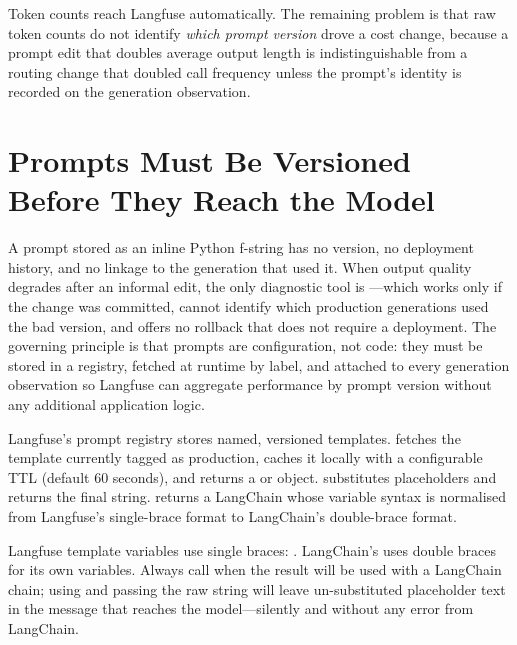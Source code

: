 Token counts reach Langfuse automatically. The remaining problem is
that raw token counts do not identify \emph{which prompt version}
drove a cost change, because a prompt edit that doubles average output
length is indistinguishable from a routing change that doubled call
frequency unless the prompt's identity is recorded on the generation
observation.


\section{Prompts Must Be Versioned Before They Reach the Model}
\label{sec:obs-prompt-management}

A prompt stored as an inline Python f-string has no version, no
deployment history, and no linkage to the generation that used it.
When output quality degrades after an informal edit, the only
diagnostic tool is ---which works only if the change
was committed, cannot identify which production generations used the
bad version, and offers no rollback that does not require a deployment.
The governing principle is that prompts are configuration, not code:
they must be stored in a registry, fetched at runtime by label, and
attached to every generation observation so Langfuse can aggregate
performance by prompt version without any additional application logic.

Langfuse's prompt registry stores named, versioned templates.
 fetches the
template currently tagged as production, caches it locally with a
configurable TTL (default 60 seconds), and returns a
 or  object.
 substitutes placeholders and returns
the final string.  returns a
LangChain  whose variable syntax is normalised
from Langfuse's single-brace format to LangChain's double-brace format.

\begin{warningbox}
Langfuse template variables use single braces: .
LangChain's  uses double braces for its own
variables. Always call  when the
result will be used with a LangChain chain; using  and
passing the raw string will leave un-substituted placeholder text in the
message that reaches the model---silently and without any error from
LangChain.
\end{warningbox}


